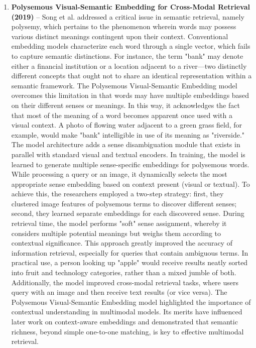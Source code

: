 \documentclass[conference]{IEEEtran}
\begin{document}
\begin{enumerate}
\item \textbf{Polysemous Visual-Semantic Embedding for Cross-Modal Retrieval
 (2019)} – Song et al. \cite{song2019polysemous} addressed a critical issue in semantic retrieval, namely polysemy, which pertains to the phenomenon wherein words may possess various distinct meanings contingent upon their context. Conventional embedding models characterize each word through a single vector, which fails to capture semantic distinctions. For instance, the term "bank" may denote either a financial institution or a location adjacent to a river—two distinctly different concepts that ought not to share an identical representation within a semantic framework.
The Polysemous Visual-Semantic Embedding model overcomes this limitation in that words may have multiple embeddings based on their different senses or meanings. In this way, it acknowledges the fact that most of the meaning of a word becomes apparent once used with a visual context. A photo of flowing water adjacent to a green grass field, for example, would make "bank" intelligible in use of its meaning as "riverside."
The model architecture adds a sense disambiguation module that exists in parallel with standard visual and textual encoders. In training, the model is learned to generate multiple sense-specific embeddings for polysemous words. While processing a query or an image, it dynamically selects the most appropriate sense embedding based on context present (visual or textual).
To achieve this, the researchers employed a two-step strategy: first, they clustered image features of polysemous terms to discover different senses; second, they learned separate embeddings for each discovered sense. During retrieval time, the model performs "soft" sense assignment, whereby it considers multiple potential meanings but weighs them according to contextual significance.
This approach greatly improved the accuracy of information retrieval, especially for queries that contain ambiguous terms. In practical use, a person looking up "apple" would receive results neatly sorted into fruit and technology categories, rather than a mixed jumble of both. Additionally, the model improved cross-modal retrieval tasks, where users query with an image and then receive text results (or vice versa).
The Polysemous Visual-Semantic Embedding model highlighted the importance of contextual understanding in multimodal models. Its merits have influenced later work on context-aware embeddings and demonstrated that semantic richness, beyond simple one-to-one matching, is key to effective multimodal retrieval.


\end{enumerate}
\end{document}
